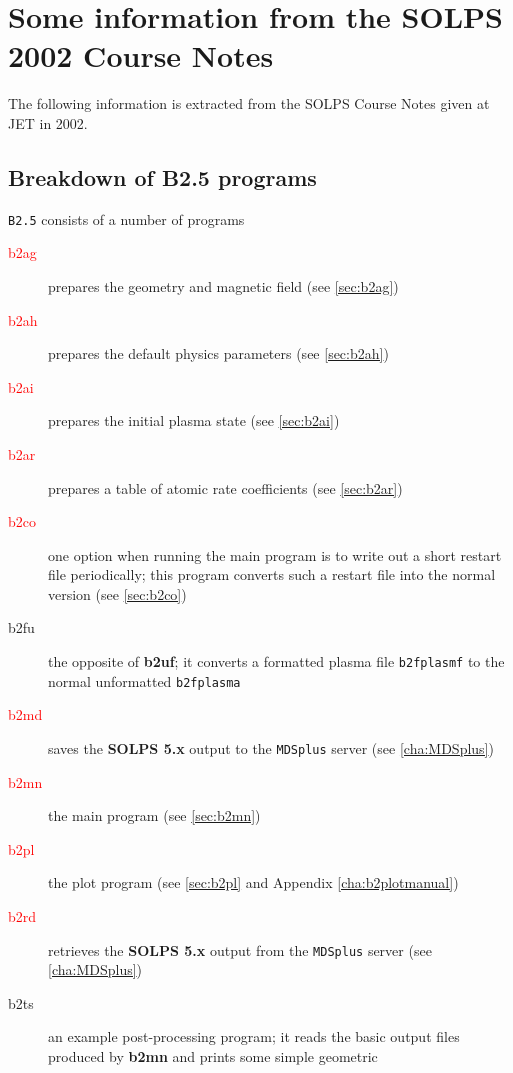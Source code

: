 \documentclass[a4paper,10pt]{report}
\newcommand\SOLPSfive{{\bf SOLPS 5.x} }
\begin{document}
\chapter{Some information from the SOLPS 2002 Course Notes}
\label{cha:coursenotes}

The following information is extracted from the SOLPS Course Notes given at
JET in 2002.

\section{Breakdown of B2.5 programs}
\label{sec:b2programs}

{\tt B2.5} consists of a number of programs
\begin{description}
\item[\textcolor{Red}{b2ag}]  prepares the geometry and magnetic field (see \ref{sec:b2ag})
\item[\textcolor{Red}{b2ah}]  prepares the default physics parameters (see \ref{sec:b2ah})
\item[\textcolor{Red}{b2ai}]  prepares the initial plasma state (see \ref{sec:b2ai})
\item[\textcolor{Red}{b2ar}]  prepares a table of atomic rate coefficients (see \ref{sec:b2ar})
\item[\textcolor{Red}{b2co}]  one option when running the main program is to write out a
  short restart file periodically; this program converts such a
  restart file into the normal version (see \ref{sec:b2co})
\item[b2fu]  the opposite of {\bf b2uf}; it converts a formatted plasma
  file {\tt b2fplasmf} to the normal unformatted {\tt b2fplasma}
\item[\textcolor{Red}{b2md}]  saves the \SOLPSfive output to the {\tt MDSplus} server (see \ref{cha:MDSplus})
\item[\textcolor{Red}{b2mn}]  the main program (see \ref{sec:b2mn})
\item[\textcolor{Red}{b2pl}]  the plot program (see \ref{sec:b2pl} and Appendix \ref{cha:b2plotmanual})
\item[\textcolor{Red}{b2rd}]  retrieves the \SOLPSfive output from the {\tt MDSplus} server (see \ref{cha:MDSplus})
\item[b2ts]  an example post-processing program; it reads the basic
  output files produced by {\bf b2mn} and prints some simple geometric

\end{description}
\end{document}
